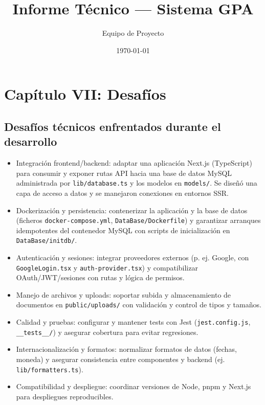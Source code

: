 \documentclass[12pt]{report}
\title{Informe Técnico — Sistema GPA}
\author{Equipo de Proyecto}
\date{\today}
\begin{document}
\maketitle
\tableofcontents
\cleardoublepage

\chapter{Capítulo VII: Desafíos}
\section{Desafíos técnicos enfrentados durante el desarrollo}
\begin{itemize}
  \item Integración frontend/backend: adaptar una aplicación Next.js (TypeScript) para consumir y exponer rutas API hacia una base de datos MySQL administrada por \texttt{lib/database.ts} y los modelos en \texttt{models/}. Se diseñó una capa de acceso a datos y se manejaron conexiones en entornos SSR.
  \item Dockerización y persistencia: contenerizar la aplicación y la base de datos (ficheros \texttt{docker-compose.yml}, \texttt{DataBase/Dockerfile}) y garantizar arranques idempotentes del contenedor MySQL con scripts de inicialización en \texttt{DataBase/initdb/}.
  \item Autenticación y sesiones: integrar proveedores externos (p. ej. Google, con \texttt{GoogleLogin.tsx} y \texttt{auth-provider.tsx}) y compatibilizar OAuth/JWT/sesiones con rutas y lógica de permisos.
  \item Manejo de archivos y uploads: soportar subida y almacenamiento de documentos en \texttt{public/uploads/} con validación y control de tipos y tamaños.
  \item Calidad y pruebas: configurar y mantener tests con Jest (\texttt{jest.config.js}, \texttt{__tests__/}) y asegurar cobertura para evitar regresiones.
  \item Internacionalización y formatos: normalizar formatos de datos (fechas, moneda) y asegurar consistencia entre componentes y backend (ej. \texttt{lib/formatters.ts}).
  \item Compatibilidad y despliegue: coordinar versiones de Node, pnpm y Next.js para despliegues reproducibles.
\end{itemize}
\end{document}
